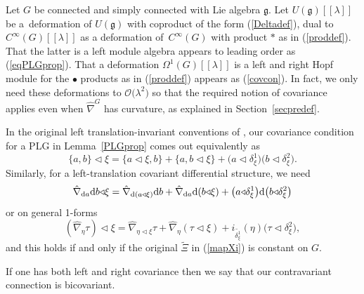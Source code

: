 \documentclass[10pt,a4paper]{amsart}
\numberwithin{equation}{section}
\newcommand{\<}{{\langle}}
\renewcommand{\>}{{\rangle}}
\newcommand{\extd}{{\rm d}}
\newcommand{\ra}{{\triangleleft}}
\newcommand{\cg}{{\mathfrak{g}}}
\begin{document}
\begin{Remark}\label{actionconn} Let $G$ be connected and simply connected with Lie algebra $\cg$. Let $U(\cg)[[\lambda]]$ be a~deformation of $U(\cg)$ with coproduct of the form (\ref{Deltadef}), dual to $C^\infty(G)[[\lambda]]$ as a deformation of~$C^\infty(G)$ with product $*$ as in (\ref{proddef}). That the latter is a left module algebra appears to leading order as (\ref{eqPLGprop}). That a deformation $\Omega^1(G)[[\lambda]]$ is a left and right Hopf module for the $\bullet$ products as in (\ref{proddef}) appears as (\ref{covcon}). In fact, we only need these deformations to $\mathcal{O}\big(\lambda^2\big)$ so that the required notion of covariance applies even when $\hat\nabla^G$ has curvature, as explained in Section~\ref{secpredef}.
 \end{Remark}

\begin{Remark}\label{leftinvversion} In the original left translation-invariant conventions of \cite{BegMa:sem,MaTao:plg}, our covariance condition for a PLG in Lemma~\ref{PLGprop} comes out equivalently as
\begin{equation}\label{actionPBright}
\{ a,b\}\ra\xi=\{a\ra\xi,b\}+\{a,b\ra\xi\}+\big(a\ra\delta_\xi^1\big)\big(b\ra\delta^2_\xi\big).
\end{equation}
Similarly, for a left-translation covariant differential structure, we need
\begin{equation*}%
\hat\nabla_{\extd a}\extd b\ra\xi=\hat\nabla_{\extd(a\ra\xi)}\extd b+\hat\nabla_{\extd a}\extd(b\ra\xi)+\big(a\ra\delta_\xi^1\big)\extd\big(b\ra\delta_\xi^2\big)
\end{equation*}
or on general 1-forms
\begin{equation}\label{generalactionconnright}
(\hat\nabla_{\eta}\tau)\ra\xi=\hat\nabla_{\eta\ra\xi}\tau+\hat\nabla_{\eta}(\tau\ra\xi)+i_{\tilde{\delta_\xi^1}}(\eta) \big(\tau\ra\delta_\xi^2\big),
\end{equation}
and this holds if and only if the original $\tilde\Xi$ in (\ref{mapXi}) is constant on $G$.
\end{Remark}

If one has both left and right covariance then we say that our contravariant connection is bicovariant.
\end{document}
